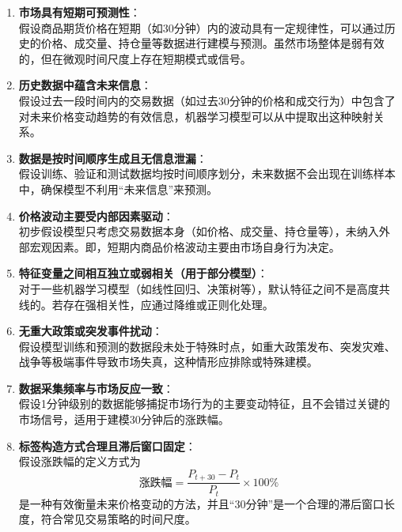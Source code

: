 \documentclass[a4paper,12pt]{ctexart}
\begin{document}
\begin{enumerate}
    \item \textbf{市场具有短期可预测性}：\\
    假设商品期货价格在短期（如30分钟）内的波动具有一定规律性，可以通过历史的价格、成交量、持仓量等数据进行建模与预测。虽然市场整体是弱有效的，但在微观时间尺度上存在短期模式或信号。

    \item \textbf{历史数据中蕴含未来信息}：\\
    假设过去一段时间内的交易数据（如过去30分钟的价格和成交行为）中包含了对未来价格变动趋势的有效信息，机器学习模型可以从中提取出这种映射关系。

    \item \textbf{数据是按时间顺序生成且无信息泄漏}：\\
    假设训练、验证和测试数据均按时间顺序划分，未来数据不会出现在训练样本中，确保模型不利用“未来信息”来预测。

    \item \textbf{价格波动主要受内部因素驱动}：\\
    初步假设模型只考虑交易数据本身（如价格、成交量、持仓量等），未纳入外部宏观因素。即，短期内商品价格波动主要由市场自身行为决定。

    \item \textbf{特征变量之间相互独立或弱相关（用于部分模型）}：\\
    对于一些机器学习模型（如线性回归、决策树等），默认特征之间不是高度共线的。若存在强相关性，应通过降维或正则化处理。

    \item \textbf{无重大政策或突发事件扰动}：\\
    假设模型训练和预测的数据段未处于特殊时点，如重大政策发布、突发灾难、战争等极端事件导致市场失真，这种情形应排除或特殊建模。

    \item \textbf{数据采集频率与市场反应一致}：\\
    假设1分钟级别的数据能够捕捉市场行为的主要变动特征，且不会错过关键的市场信号，适用于建模30分钟后的涨跌幅。

    \item \textbf{标签构造方式合理且滞后窗口固定}：\\
    假设涨跌幅的定义方式为
    \[
    \text{涨跌幅} = \frac{P_{t+30} - P_t}{P_t} \times 100\%
    \]
    是一种有效衡量未来价格变动的方法，并且“30分钟”是一个合理的滞后窗口长度，符合常见交易策略的时间尺度。
\end{enumerate}
\end{document}
